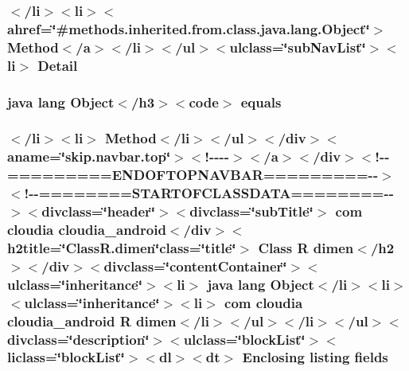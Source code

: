 \hypertarget{_r_8dimen_8html_aed0df2ae11502bf9389ac3cf53b1c0f6}{
\subsubsection[{Detail}]{\setlength{\rightskip}{0pt plus 5cm}$<$/li$>$$<$li$>$$<$ahref=\char`\"{}\#methods.\-inherited.\-from.\-class.\-java.\-lang.\-Object\char`\"{}$>$ Method$<$/{\bf a}$>$$<$/li$>$$<$/ul$>$$<$ulclass=\char`\"{}sub\-Nav\-List\char`\"{}$>$$<$li$>$ Detail}}\label{_r_8dimen_8html_aed0df2ae11502bf9389ac3cf53b1c0f6}
\hypertarget{_r_8dimen_8html_a8974318cea585f72df717e0380ec7104}{
\subsubsection[{equals}]{\setlength{\rightskip}{0pt plus 5cm}java lang Object$<$/h3$>$$<$code$>$ equals}}\label{_r_8dimen_8html_a8974318cea585f72df717e0380ec7104}
\hypertarget{_r_8dimen_8html_a6e86947d112e962646e2a06e8b7f2952}{
\subsubsection[{fields}]{\setlength{\rightskip}{0pt plus 5cm}$<$/li$>$$<$li$>$ Method$<$/li$>$$<$/ul$>$$<$/div$>$$<$aname=\char`\"{}skip.\-navbar.\-top\char`\"{}$>$$<$!-\/-\/-\/-\/$>$$<$/a$>$$<$/div$>$$<$!-\/-\/=========E\-N\-D\-O\-F\-T\-O\-P\-N\-A\-V\-B\-A\-R=========-\/-\/$>$$<$!-\/-\/========S\-T\-A\-R\-T\-O\-F\-C\-L\-A\-S\-S\-D\-A\-T\-A========-\/-\/$>$$<$divclass=\char`\"{}header\char`\"{}$>$$<$divclass=\char`\"{}sub\-Title\char`\"{}$>$ com cloudia cloudia\-\_\-android$<$/div$>$$<$h2title=\char`\"{}Class\-R.\-dimen\char`\"{}class=\char`\"{}title\char`\"{}$>$ Class {\bf R} {\bf dimen}$<$/h2$>$$<$/div$>$$<$divclass=\char`\"{}content\-Container\char`\"{}$>$$<$ulclass=\char`\"{}inheritance\char`\"{}$>$$<$li$>$ java lang Object$<$/li$>$$<$li$>$$<$ulclass=\char`\"{}inheritance\char`\"{}$>$$<$li$>$ com cloudia cloudia\-\_\-android {\bf R} {\bf dimen}$<$/li$>$$<$/ul$>$$<$/li$>$$<$/ul$>$$<$divclass=\char`\"{}description\char`\"{}$>$$<$ulclass=\char`\"{}block\-List\char`\"{}$>$$<$liclass=\char`\"{}block\-List\char`\"{}$>$$<$dl$>$$<${\bf dt}$>$ Enclosing listing fields}}\label{_r_8dimen_8html_a6e86947d112e962646e2a06e8b7f2952}
